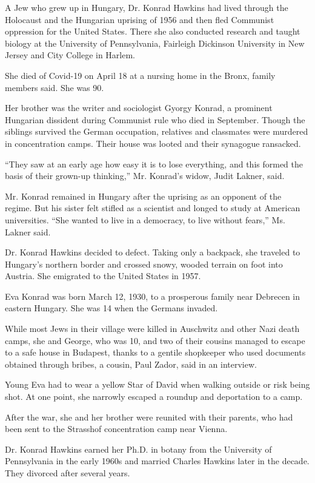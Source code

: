 A Jew who grew up in Hungary, Dr. Konrad Hawkins had lived through the
Holocaust and the Hungarian uprising of 1956 and then fled Communist
oppression for the United States. There she also conducted research and
taught biology at the University of Pennsylvania, Fairleigh Dickinson
University in New Jersey and City College in Harlem.

She died of Covid-19 on April 18 at a nursing home in the Bronx, family
members said. She was 90.

Her brother was the writer and sociologist Gyorgy Konrad, a prominent
Hungarian dissident during Communist rule who died in September. Though
the siblings survived the German occupation, relatives and classmates
were murdered in concentration camps. Their house was looted and their
synagogue ransacked.

``They saw at an early age how easy it is to lose everything, and this
formed the basis of their grown-up thinking,'' Mr. Konrad's widow, Judit
Lakner, said.

Mr. Konrad remained in Hungary after the uprising as an opponent of the
regime. But his sister felt stifled as a scientist and longed to study
at American universities. ``She wanted to live in a democracy, to live
without fears,'' Ms. Lakner said.

Dr. Konrad Hawkins decided to defect. Taking only a backpack, she
traveled to Hungary's northern border and crossed snowy, wooded terrain
on foot into Austria. She emigrated to the United States in 1957.

Eva Konrad was born March 12, 1930, to a prosperous family near Debrecen
in eastern Hungary. She was 14 when the Germans invaded.

While most Jews in their village were killed in Auschwitz and other Nazi
death camps, she and George, who was 10, and two of their cousins
managed to escape to a safe house in Budapest, thanks to a gentile
shopkeeper who used documents obtained through bribes, a cousin, Paul
Zador, said in an interview.

Young Eva had to wear a yellow Star of David when walking outside or
risk being shot. At one point, she narrowly escaped a roundup and
deportation to a camp.

After the war, she and her brother were reunited with their parents, who
had been sent to the Strasshof concentration camp near Vienna.

Dr. Konrad Hawkins earned her Ph.D. in botany from the University of
Pennsylvania in the early 1960s and married Charles Hawkins later in the
decade. They divorced after several years.

